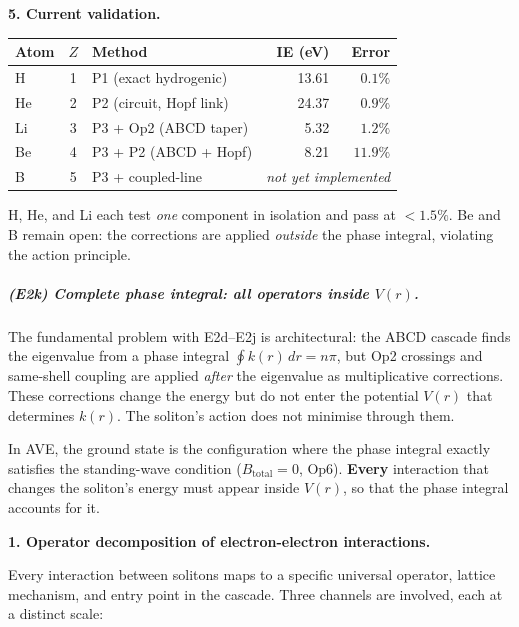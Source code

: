 \noindent\textbf{5. Current validation.}
\begin{center}
\small
\renewcommand{\arraystretch}{1.2}
\begin{tabular}{l c l r r}
\toprule
\textbf{Atom} & $Z$ &
\textbf{Method} &
\textbf{IE (eV)} &
\textbf{Error} \\
\midrule
H & 1 & P1 (exact hydrogenic) &
    13.61 & $0.1\%$ \\
He & 2 & P2 (circuit, Hopf link) &
    24.37 & $0.9\%$ \\
Li & 3 & P3 + Op2 (ABCD taper) &
    5.32 & $1.2\%$ \\
Be & 4 & P3 + P2 (ABCD + Hopf) &
    8.21 & $11.9\%$ \\
\midrule
B & 5 & P3 + coupled-line &
    \multicolumn{2}{c}{\emph{not yet implemented}} \\
\bottomrule
\end{tabular}
\end{center}
\noindent H, He, and Li each test \emph{one}
component in isolation and pass at $< 1.5\%$.
Be and B remain open: the corrections are
applied \emph{outside} the phase integral,
violating the action principle.

\subparagraph{(E2k) Complete phase integral:
all operators inside $V(r)$.}

The fundamental problem with E2d--E2j is
architectural: the ABCD cascade finds the
eigenvalue from a phase integral
$\oint k(r)\,dr = n\pi$, but Op2 crossings
and same-shell coupling are applied
\emph{after} the eigenvalue as multiplicative
corrections.  These corrections change the
energy but do not enter the potential $V(r)$
that determines $k(r)$.  The soliton's action
does not minimise through them.

In AVE, the ground state is the configuration
where the phase integral exactly satisfies
the standing-wave condition ($B_{\text{total}}
= 0$, Op6).  \textbf{Every} interaction that
changes the soliton's energy must appear inside
$V(r)$, so that the phase integral accounts
for it.

\noindent\textbf{1. Operator decomposition of
electron-electron interactions.}

Every interaction between solitons maps to a
specific universal operator, lattice mechanism,
and entry point in the cascade.  Three channels
are involved, each at a distinct scale:

